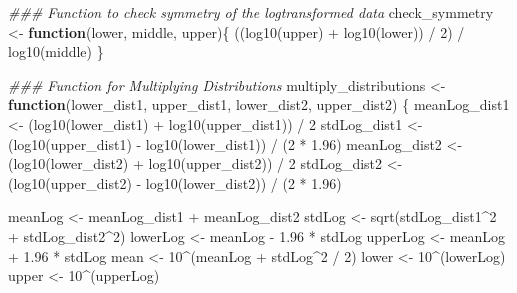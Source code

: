 \documentclass[
  letterpaper,
  DIV=11,
  numbers=noendperiod]{scrartcl}
\newenvironment{Shaded}{\begin{snugshade}}{\end{snugshade}}
\newcommand{\ControlFlowTok}[1]{\textcolor[rgb]{0.00,0.23,0.31}{\textbf{#1}}}
\newcommand{\DecValTok}[1]{\textcolor[rgb]{0.68,0.00,0.00}{#1}}
\newcommand{\DocumentationTok}[1]{\textcolor[rgb]{0.37,0.37,0.37}{\textit{#1}}}
\newcommand{\FloatTok}[1]{\textcolor[rgb]{0.68,0.00,0.00}{#1}}
\newcommand{\FunctionTok}[1]{\textcolor[rgb]{0.28,0.35,0.67}{#1}}
\newcommand{\NormalTok}[1]{\textcolor[rgb]{0.00,0.23,0.31}{#1}}
\newcommand{\OtherTok}[1]{\textcolor[rgb]{0.00,0.23,0.31}{#1}}
\newcommand{\SpecialCharTok}[1]{\textcolor[rgb]{0.37,0.37,0.37}{#1}}
\begin{document}
\begin{Shaded}
\begin{Highlighting}[]
\DocumentationTok{\#\#\# Function to check symmetry of the logtransformed data}
\NormalTok{check\_symmetry }\OtherTok{\textless{}{-}} \ControlFlowTok{function}\NormalTok{(lower,  middle,  upper)\{}
\NormalTok{ ((}\FunctionTok{log10}\NormalTok{(upper) }\SpecialCharTok{+} \FunctionTok{log10}\NormalTok{(lower))  }\SpecialCharTok{/}  \DecValTok{2}\NormalTok{)  }\SpecialCharTok{/}  \FunctionTok{log10}\NormalTok{(middle)}
\NormalTok{\}}

\DocumentationTok{\#\#\# Function for Multiplying Distributions}
\NormalTok{multiply\_distributions }\OtherTok{\textless{}{-}} \ControlFlowTok{function}\NormalTok{(lower\_dist1,  upper\_dist1,  lower\_dist2,  upper\_dist2)}
\NormalTok{\{}
\NormalTok{ meanLog\_dist1 }\OtherTok{\textless{}{-}}\NormalTok{ (}\FunctionTok{log10}\NormalTok{(lower\_dist1) }\SpecialCharTok{+} \FunctionTok{log10}\NormalTok{(upper\_dist1))  }\SpecialCharTok{/}  \DecValTok{2}
\NormalTok{ stdLog\_dist1 }\OtherTok{\textless{}{-}}\NormalTok{ (}\FunctionTok{log10}\NormalTok{(upper\_dist1) }\SpecialCharTok{{-}} \FunctionTok{log10}\NormalTok{(lower\_dist1))  }\SpecialCharTok{/}\NormalTok{  (}\DecValTok{2} \SpecialCharTok{*} \FloatTok{1.96}\NormalTok{)}
\NormalTok{ meanLog\_dist2 }\OtherTok{\textless{}{-}}\NormalTok{ (}\FunctionTok{log10}\NormalTok{(lower\_dist2) }\SpecialCharTok{+} \FunctionTok{log10}\NormalTok{(upper\_dist2))  }\SpecialCharTok{/}  \DecValTok{2}
\NormalTok{ stdLog\_dist2 }\OtherTok{\textless{}{-}}\NormalTok{ (}\FunctionTok{log10}\NormalTok{(upper\_dist2) }\SpecialCharTok{{-}} \FunctionTok{log10}\NormalTok{(lower\_dist2))  }\SpecialCharTok{/}\NormalTok{  (}\DecValTok{2} \SpecialCharTok{*} \FloatTok{1.96}\NormalTok{)}
 
 
\NormalTok{ meanLog }\OtherTok{\textless{}{-}}\NormalTok{ meanLog\_dist1 }\SpecialCharTok{+}\NormalTok{ meanLog\_dist2}
\NormalTok{ stdLog }\OtherTok{\textless{}{-}} \FunctionTok{sqrt}\NormalTok{(stdLog\_dist1}\SpecialCharTok{\^{}}\DecValTok{2} \SpecialCharTok{+}\NormalTok{ stdLog\_dist2}\SpecialCharTok{\^{}}\DecValTok{2}\NormalTok{)}
\NormalTok{ lowerLog }\OtherTok{\textless{}{-}}\NormalTok{ meanLog }\SpecialCharTok{{-}} \FloatTok{1.96} \SpecialCharTok{*}\NormalTok{ stdLog}
\NormalTok{ upperLog }\OtherTok{\textless{}{-}}\NormalTok{ meanLog }\SpecialCharTok{+} \FloatTok{1.96} \SpecialCharTok{*}\NormalTok{ stdLog}
\NormalTok{ mean }\OtherTok{\textless{}{-}} \DecValTok{10}\SpecialCharTok{\^{}}\NormalTok{(meanLog }\SpecialCharTok{+}\NormalTok{ stdLog}\SpecialCharTok{\^{}}\DecValTok{2}  \SpecialCharTok{/}  \DecValTok{2}\NormalTok{)}
\NormalTok{ lower }\OtherTok{\textless{}{-}} \DecValTok{10}\SpecialCharTok{\^{}}\NormalTok{(lowerLog)}
\NormalTok{ upper }\OtherTok{\textless{}{-}} \DecValTok{10}\SpecialCharTok{\^{}}\NormalTok{(upperLog)}
 

\end{Highlighting}
\end{Shaded}
\end{document}
